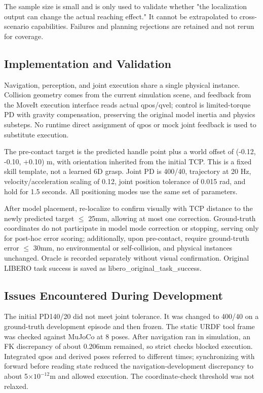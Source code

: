 The sample size is small and is only used to validate whether "the localization output can change the actual reaching effect." It cannot be extrapolated to cross-scenario capabilities. Failures and planning rejections are retained and not rerun for coverage.


\subsection{Implementation and Validation}\label{s19-detail-2}

Navigation, perception, and joint execution share a single physical instance. Collision geometry comes from the current simulation scene, and feedback from the MoveIt execution interface reads actual qpos/qvel; control is limited-torque PD with gravity compensation, preserving the original model inertia and physics substeps. No runtime direct assignment of qpos or mock joint feedback is used to substitute execution.

The pre-contact target is the predicted handle point plus a world offset of (-0.12, -0.10, +0.10) m, with orientation inherited from the initial TCP. This is a fixed skill template, not a learned 6D grasp. Joint PD is 400/40, trajectory at 20 Hz, velocity/acceleration scaling of 0.12, joint position tolerance of 0.015 rad, and hold for 1.5 seconds. All positioning modes use the same set of parameters.

After model placement, re-localize to confirm visually with TCP distance to the newly predicted target \(\leq\) 25mm, allowing at most one correction. Ground-truth coordinates do not participate in model mode correction or stopping, serving only for post-hoc error scoring; additionally, upon pre-contact, require ground-truth error \(\leq\) 30mm, no environmental or self-collision, and physical instances unchanged. Oracle is recorded separately without visual confirmation. Original LIBERO task success is saved as libero\_original\_task\_success.

\subsection{Issues Encountered During Development}\label{s19-detail-3}

The initial PD140/20 did not meet joint tolerance. It was changed to 400/40 on a ground-truth development episode and then frozen. The static URDF tool frame was checked against MuJoCo at 8 poses. After navigation ran in simulation, an FK discrepancy of about 0.206mm remained, so strict checks blocked execution. Integrated qpos and derived poses referred to different times; synchronizing with forward before reading state reduced the navigation-development discrepancy to about 5\(\times\)\(10^{-12}\)m and allowed execution. The coordinate-check threshold was not relaxed.

